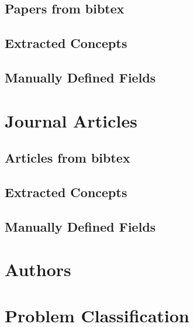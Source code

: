 \documentclass[a4paper]{article}
\begin{document}
\clearpage
\subsection{Papers from bibtex}


\clearpage
\subsection{Extracted Concepts}


\clearpage
\subsection{Manually Defined Fields}


\clearpage
\section{Journal Articles}

\clearpage
\subsection{Articles from bibtex}



\clearpage
\subsection{Extracted Concepts}


\clearpage
\subsection{Manually Defined Fields}


\clearpage
\section{Authors}




\clearpage
\section{Problem Classification}
\end{document}
